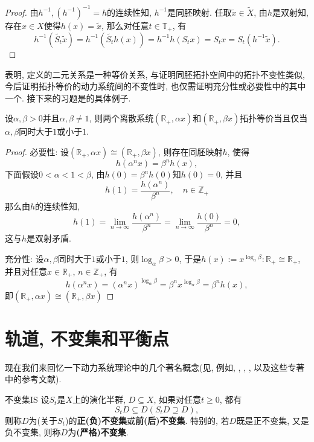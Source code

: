 \begin{proof}
	由$h^{-1},(h^{-1})^{-1}=h$的连续性知, $h^{-1}$是同胚映射. 任取$\tilde{x}\in \tilde{X}$, 由$h$是双射知, 存在$x\in X$使得$h(x)=\tilde{x}$, 那么对任意$t\in\mathbb{T}_{+}$, 有$$
	h^{-1}(\tilde{S_{t}}\tilde{x})=h^{-1}(\tilde{S_{t}}h(x))=h^{-1}h(S_{t}x)=S_{t}x=S_{t}(h^{-1}\tilde{x}).$$
\end{proof}

表明, 定义的二元关系是一种等价关系, 与证明同胚拓扑空间中的拓扑不变性类似, 今后证明拓扑等价的动力系统间的不变性时, 也仅需证明充分性或必要性中的其中一个. 接下来的习题是的具体例子. 

\begin{exercise}
设$\alpha,\beta>0$并且$\alpha,\beta\neq 1$, 则两个离散系统$(\mathbb{R}_{+},\alpha x)$和$(\mathbb{R}_{+},\beta x)$拓扑等价当且仅当$\alpha,\beta$同时大于$1$或小于$1$.
\end{exercise}

\begin{proof}
	必要性: 设$(\mathbb{R}_{+},\alpha x)\cong (\mathbb{R}_{+},\beta x)$, 则存在同胚映射$h$, 使得$$
	h(\alpha^{n} x)=\beta^{n} h(x),$$下面假设$0<\alpha <1<\beta$, 由$h(0)=\beta^{n} h(0)$知$h(0)=0$, 并且$$h(1)=\frac{h(\alpha^{n})}{\beta^{n}},\quad n\in\mathbb{Z}_{+}$$那么由$h$的连续性知, $$h(1)=\lim_{n\to\infty}\frac{h(\alpha^{n})}{\beta^{n}}=\lim_{n\to\infty}\frac{h(0)}{\beta^{n}}=0,$$这与$h$是双射矛盾.
	
	充分性: 设$\alpha,\beta$同时大于$1$或小于$1$, 则$\log_{\alpha}\beta>0$, 于是$h(x):=x^{\log_{\alpha}\beta}:\mathbb{R}_{+}\cong \mathbb{R}_{+}$, 并且对任意$x\in\mathbb{R}_{+}$, $n\in \mathbb{Z}_{+}$, 有$$h(\alpha^{n} x)=(\alpha^{n} x)^{\log_{\alpha}\beta}=\beta^{n} x^{\log_{\alpha}\beta}=\beta^{n} h(x),$$即$(\mathbb{R}_{+},\alpha x)\cong (\mathbb{R}_{+},\beta x)$
\end{proof}


\section{轨道, 不变集和平衡点}
现在我们来回忆一下动力系统理论中的几个著名概念(见, 例如\cite{Babin92}, \cite{Chueshov99}, \cite{Nemytskii60}, \cite{Sibirsky75}, \cite{Temam97}以及这些专著中的参考文献).

\begin{definition}{不变集}{IS}
	设$S_{t}$是$X$上的演化半群, $D\subseteq X$, 如果对任意$t\geqslant 0$, 都有$$
	S_{t}D\subseteq D(S_{t}D \supseteq D),$$则称$D$为(关于$S_{t}$)的\textbf{正(负)不变集}或\textbf{前(后)不变集}. 特别的, 若$D$既是正不变集, 又是负不变集, 则称$D$为\textbf{(严格)不变集}.
\end{definition}

